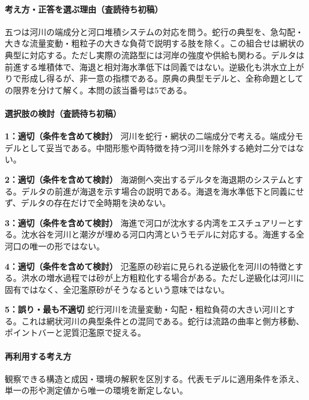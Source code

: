 \paragraph{考え方・正答を選ぶ理由（査読待ち初稿）} 五つは河川の端成分と河口堆積システムの対応を問う。蛇行の典型を、急勾配・大きな流量変動・粗粒子の大きな負荷で説明する肢を除く。この組合せは網状の典型に対応する。ただし実際の流路型には河岸の強度や供給も関わる。デルタは前進する堆積体で、海退と相対海水準低下は同義ではない。逆級化も洪水立上がりで形成し得るが、非一意の指標である。原典の典型モデルと、全称命題としての限界を分けて解く。本問の該当番号は5である。

\paragraph{選択肢の検討（査読待ち初稿）}\mbox{}\par

\noindent\textbf{1：適切（条件を含めて検討）} 河川を蛇行・網状の二端成分で考える。端成分モデルとして妥当である。中間形態や両特徴を持つ河川を除外する絶対二分ではない。\par

\noindent\textbf{2：適切（条件を含めて検討）} 海湖側へ突出するデルタを海退期のシステムとする。デルタの前進が海退を示す場合の説明である。海退を海水準低下と同義にせず、デルタの存在だけで全時期を決めない。\par

\noindent\textbf{3：適切（条件を含めて検討）} 海進で河口が沈水する内湾をエスチュアリーとする。沈水谷を河川と潮汐が埋める河口内湾というモデルに対応する。海進する全河口の唯一の形ではない。\par

\noindent\textbf{4：適切（条件を含めて検討）} 氾濫原の砂岩に見られる逆級化を河川の特徴とする。洪水の増水過程では砂が上方粗粒化する場合がある。ただし逆級化は河川に固有ではなく、全氾濫原砂がそうなるという意味ではない。\par

\noindent\textbf{5：誤り・最も不適切} 蛇行河川を流量変動・勾配・粗粒負荷の大きい河川とする。これは網状河川の典型条件との混同である。蛇行は流路の曲率と側方移動、ポイントバーと泥質氾濫原で捉える。\par

\paragraph{再利用する考え方} 観察できる構造と成因・環境の解釈を区別する。代表モデルに適用条件を添え、単一の形や測定値から唯一の環境を断定しない。

